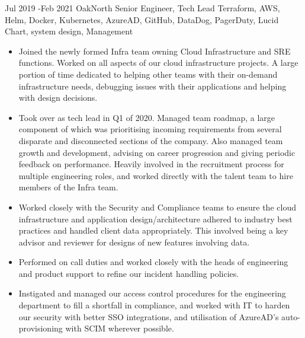 \documentclass[10pt]{article} %
\begin{document}
\jobheader
{Jul 2019 -}{Feb 2021}
{OakNorth}
{Senior Engineer, Tech Lead}
{
      Terraform,
      AWS,
      Helm,
      Docker,
      Kubernetes,
      AzureAD,
      GitHub,
      DataDog,
      PagerDuty,
      Lucid Chart,
      system design,
      Management
}
  \begin{itemize}

  \item Joined the newly formed Infra team owning Cloud Infrastructure and SRE functions.
        Worked on all aspects of our cloud infrastructure projects.
        A large portion of time dedicated to helping other teams with their on-demand infrastructure needs,
        debugging issues with their applications and helping with design decisions.

  \item Took over as tech lead in Q1 of 2020. Managed team roadmap, a large component
        of which was prioritising incoming requirements from several disparate and disconnected
        sections of the company. Also managed team growth and development, advising on career
        progression and giving periodic feedback on performance. Heavily involved in
        the recruitment process for multiple engineering roles, and worked directly with the talent
        team to hire members of the Infra team.

  \item Worked closely with the Security and Compliance teams to ensure
        the cloud infrastructure and application design/architecture adhered to industry
        best practices and handled client data appropriately. This involved being a key
        advisor and reviewer for designs of new features involving data.

  \item Performed on call duties and worked closely with the heads of engineering and product support
        to refine our incident handling policies.

  \item Instigated and managed our access control procedures for the engineering department
        to fill a shortfall in compliance, and worked with IT to harden our security
        with better SSO integrations, and utilisation of AzureAD's auto-provisioning
        with SCIM wherever possible.

  \end{itemize}
\end{document}
